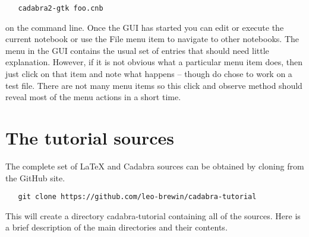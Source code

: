 \documentclass[a4paper,12pt]{article}
\numberwithin{equation}{section}%
\begin{document}
\bgroup
\lstset{numbers=none}
\begin{lstlisting}
   cadabra2-gtk foo.cnb
\end{lstlisting}
\egroup

on the command line. Once the GUI has started you can edit or execute the current notebook or
use the {\tts File} menu item to navigate to other notebooks. The menu in the GUI contains
the usual set of entries that should need little explanation. However, if it is not obvious
what a particular menu item does, then just click on that item and note what happens --
though do chose to work on a test file. There are not many menu items so this click and
observe method should reveal most of the menu actions in a short time.

\clearpage

\section*{The tutorial sources}

The complete set of LaTeX and Cadabra sources can be obtained by cloning from the GitHub
site.

\bgroup
\lstset{numbers=none}
\begin{lstlisting}
   git clone https://github.com/leo-brewin/cadabra-tutorial
\end{lstlisting}
\egroup

This will create a directory {\tts cadabra-tutorial} containing all of the sources. Here is a brief description of the main directories and their contents.

\def\atMYn{\vrule height  0pt depth  5pt width 0pt}
\def\atMYm{\vrule height 15pt depth  5pt width 0pt}
\def\atMYN{\vrule height 15pt depth  0pt width 0pt}
\def\Box#1{\parbox[t]{0.60\textwidth}{\sloppy \atMYN#1\atMYn}}
\end{document}
